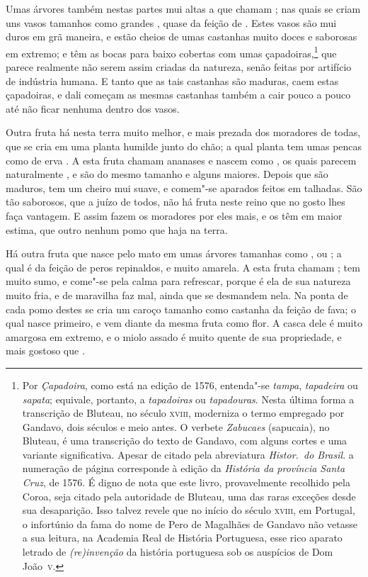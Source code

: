 Umas árvores também nestas partes mui altas a que chamam ; nas 
quais se criam uns vasos tamanhos como grandes , quase da feição
de . Estes vasos são mui duros em grã maneira, e estão
cheios de umas castanhas muito doces e saborosas em extremo; e têm as
bocas para baixo cobertas com umas çapadoiras,\footnote{ Por
\textit{Çapadoira}, como está na edição de 1576, entenda"-se
\textit{tampa}, \textit{tapadeira} ou \textit{sapata}; equivale, portanto, a
\textit{tapadoiras} ou  \textit{tapadouras}. Nesta última forma a
transcrição de Bluteau, no século \textsc{xviii}, moderniza o termo empregado
por Gandavo, dois séculos e meio antes. O verbete \textit{Zabucaes} (sapucaia), no
Bluteau, é uma transcrição do texto de Gandavo, com alguns cortes e uma variante
significativa. Apesar de citado pela abreviatura \textit{Histor.~do
Brasil}. a numeração de página corresponde à edição da \textit{História
da província Santa Cruz}, de 1576. É digno de nota que este livro,
provavelmente recolhido pela Coroa, seja citado pela autoridade de
Bluteau, uma das raras exceções desde sua desaparição. Isso
talvez revele que no início do século \textsc{xviii}, em Portugal, o infortúnio
da fama do nome de Pero de Magalhães de Gandavo não vetasse a sua
leitura, na Academia Real de História Portuguesa, esse rico aparato
letrado de \textit{(re)invenção} da história portuguesa sob os
auspícios de Dom \mbox{João \textsc{v}}.} que parece realmente não 
serem assim criadas da natureza, senão feitas por
artifício de indústria humana. E tanto que as tais castanhas são
maduras, caem estas çapadoiras, e dali começam as mesmas castanhas
também a cair pouco a pouco até não ficar nenhuma dentro dos vasos. 

Outra fruta há nesta terra muito melhor, e mais prezada dos moradores
de todas, que se cria em uma planta humilde junto do chão; a qual planta
tem umas pencas como de erva . A esta fruta chamam ananases e 		%
nascem como , os quais parecem naturalmente , e são do
mesmo tamanho e alguns maiores. Depois que são maduros, tem um cheiro
mui suave, e comem"-se aparados feitos em talhadas. São tão saborosos,
que a juízo de todos, não há fruta neste reino que no gosto lhes faça
vantagem. E assim fazem os moradores por eles mais, e os têm em maior
estima, que outro nenhum pomo que haja na terra.

Há outra fruta que nasce pelo mato em umas árvores tamanhas como
, ou ; a qual é da feição de peros repinaldos, e muito	%
amarela. A esta fruta chamam ; tem muito sumo, e come"-se pela
calma para refrescar, porque é ela de sua natureza muito fria, e de
maravilha faz mal, ainda que se desmandem nela. Na ponta de cada pomo
destes se cria um caroço tamanho como castanha da feição de fava; o
qual nasce primeiro, e vem diante da mesma fruta como flor. A casca
dele é muito amargosa em extremo, e o miolo assado é muito quente de
sua propriedade, e mais gostoso que .

